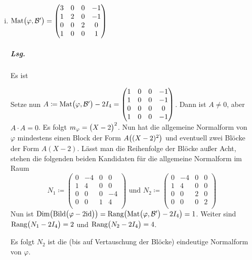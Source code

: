 \documentclass{scrreprt}
\newcommand{\Bild}{\text{Bild}}
\newcommand{\Dim}{\text{Dim}}
\newcommand{\id}{\text{id}}
\newcommand{\Mat}{\text{Mat}}
\newcommand{\Rang}{\text{Rang}}
\begin{document}
\begin{enumerate}[(i)]
\newpage
\item $\Mat\qty\big(\varphi, \mathcal{B}') = \begin{pmatrix}
    3 & 0 & 0 & -1 \\
    1 & 2 & 0 & -1 \\
    0 & 0 & 2 &  0 \\
    1 & 0 & 0 &  1 \\
  \end{pmatrix}$

  \subparagraph{Lsg.} Es ist
  Setze nun $A \coloneqq \Mat\qty\big(\varphi, \mathcal{B}') - 2I_4
  = \begin{pmatrix}
    1 & 0 & 0 & -1 \\
    1 & 0 & 0 & -1 \\
    0 & 0 & 0 &  0 \\
    1 & 0 & 0 & -1 \\
  \end{pmatrix}$.
  Dann ist $A \ne 0$, aber $A \cdot A = 0$.
  Es folgt $m_{\varphi} = \qty\big(X - 2)^2$.
  Nun hat die allgemeine Normalform von $\varphi$ mindestens einen Block der Form
  $A\qty\big((X - 2)^2)$ und eventuell zwei Blöcke der Form $A(X - 2)$.
  Lässt man die Reihenfolge der Blöcke außer Acht, stehen die folgenden beiden
  Kandidaten für die allgemeine Normalform im Raum
  \[
    N_1 \coloneqq \begin{pmatrix}
      0 & -4 & 0 &  0 \\
      1 &  4 & 0 &  0 \\
      0 &  0 & 0 & -4 \\
      0 &  0 & 1 &  4 \\
    \end{pmatrix} \text { und } N_2 \coloneqq \begin{pmatrix}
      0 & -4 & 0 & 0 \\
      1 &  4 & 0 & 0 \\
      0 &  0 & 2 & 0 \\
      0 &  0 & 0 & 2 \\
    \end{pmatrix}
  \]
  Nun ist $\Dim\qty\big(\Bild\qty\big(\varphi - 2\id)) =
  \Rang\qty\big(\Mat\qty\big(\varphi, \mathcal{B}') - 2I_4) = 1$.
  Weiter sind $\Rang\qty\big(N_1 - 2I_4) = 2$ und
  $\Rang\qty\big(N_2 - 2I_4) = 4$.

  Es folgt $N_2$ ist die (bis auf Vertauschung der Blöcke) eindeutige
  Normalform von $\varphi$.
\end{enumerate}
\end{document}
